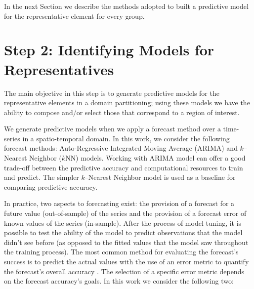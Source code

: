 In the next Section we describe the methods adopted to built a predictive model for the representative element for every group.


\section{Step 2: Identifying Models for Representatives}
\label{Sec:ModelRepresentatives}

The main objective in this step is to generate predictive models for the representative elements in a domain partitioning; using these models we have the ability to compose and/or select those that correspond to a region of interest. %

We generate predictive models when we apply a forecast method over a time-series in a spatio-temporal domain. In this work, we consider the following forecast methods: Auto-Regressive Integrated Moving Average (ARIMA) and $k$--Nearest Neighbor ($k$NN) models. Working with ARIMA model can offer a good trade-off between the predictive accuracy and computational resources to train and predict. The simpler $k$--Nearest Neighbor model is used as a baseline for comparing predictive accuracy.   

In practice, two aspects to forecasting exist: the provision of a forecast for a future value (out-of-sample) of the series and the provision of a forecast error of known values of the series (in-sample). After the process of model tuning, it is possible to test the ability of the model to predict observations that the model didn't see before (as opposed to the fitted values that the model saw throughout the training process). %
The most common method for evaluating the forecast's success is to predict the actual values with the use of an error metric to quantify the forecast's overall accuracy \cite{Hyndman2006}. The selection of a specific error metric depends on the forecast accuracy's goals. In this work we consider the following two:

